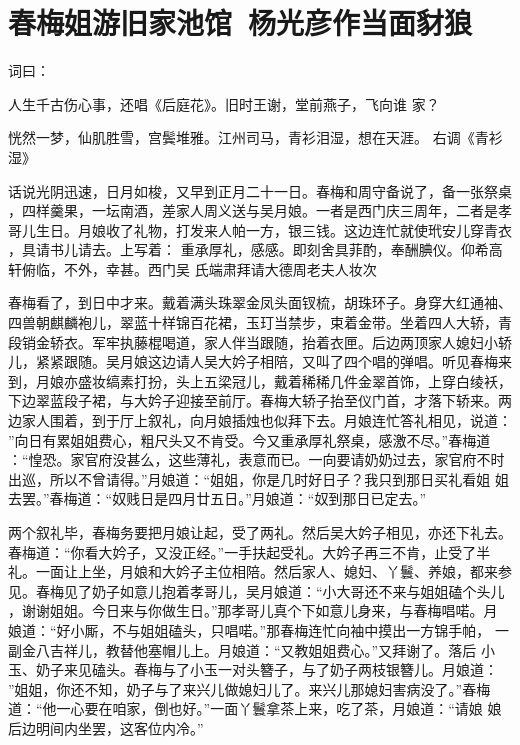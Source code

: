\chapter{春梅姐游旧家池馆~杨光彦作当面豺狼}

词曰：

人生千古伤心事，还唱《后庭花》。旧时王谢，堂前燕子，飞向谁
家？

恍然一梦，仙肌胜雪，宫鬓堆雅。江州司马，青衫泪湿，想在天涯。
右调《青衫湿》

话说光阴迅速，日月如梭，又早到正月二十一日。春梅和周守备说了，备一张祭桌
，四样羹果，一坛南酒，差家人周义送与吴月娘。一者是西门庆三周年，二者是孝
哥儿生日。月娘收了礼物，打发来人帕一方，银三钱。这边连忙就使玳安儿穿青衣
，具请书儿请去。上写着：
重承厚礼，感感。即刻舍具菲酌，奉酬腆仪。仰希高轩俯临，不外，幸甚。西门吴
氏端肃拜请大德周老夫人妆次

春梅看了，到日中才来。戴着满头珠翠金凤头面钗梳，胡珠环子。身穿大红通袖、
四兽朝麒麟袍儿，翠蓝十样锦百花裙，玉玎当禁步，束着金带。坐着四人大轿，青
段销金轿衣。军牢执藤棍喝道，家人伴当跟随，抬着衣匣。后边两顶家人媳妇小轿
儿，紧紧跟随。吴月娘这边请人吴大妗子相陪，又叫了四个唱的弹唱。听见春梅来
到，月娘亦盛妆缟素打扮，头上五梁冠儿，戴着稀稀几件金翠首饰，上穿白绫袄，
下边翠蓝段子裙，与大妗子迎接至前厅。春梅大轿子抬至仪门首，才落下轿来。两
边家人围着，到于厅上叙礼，向月娘插烛也似拜下去。月娘连忙答礼相见，说道：
”向日有累姐姐费心，粗尺头又不肯受。今又重承厚礼祭桌，感激不尽。”春梅道
：“惶恐。家官府没甚么，这些薄礼，表意而已。一向要请奶奶过去，家官府不时
出巡，所以不曾请得。”月娘道：“姐姐，你是几时好日子？我只到那日买礼看姐
姐去罢。”春梅道：“奴贱日是四月廿五日。”月娘道：“奴到那日已定去。”

两个叙礼毕，春梅务要把月娘让起，受了两礼。然后吴大妗子相见，亦还下礼去。
春梅道：“你看大妗子，又没正经。”一手扶起受礼。大妗子再三不肯，止受了半
礼。一面让上坐，月娘和大妗子主位相陪。然后家人、媳妇、丫鬟、养娘，都来参
见。春梅见了奶子如意儿抱着孝哥儿，吴月娘道：“小大哥还不来与姐姐磕个头儿
，谢谢姐姐。今日来与你做生日。”那孝哥儿真个下如意儿身来，与春梅唱喏。月
娘道：“好小厮，不与姐姐磕头，只唱喏。”那春梅连忙向袖中摸出一方锦手帕，
一副金八吉祥儿，教替他塞帽儿上。月娘道：“又教姐姐费心。”又拜谢了。落后
小玉、奶子来见磕头。春梅与了小玉一对头簪子，与了奶子两枝银簪儿。月娘道：
”姐姐，你还不知，奶子与了来兴儿做媳妇儿了。来兴儿那媳妇害病没了。”春梅
道：“他一心要在咱家，倒也好。”一面丫鬟拿茶上来，吃了茶，月娘道：“请娘
娘后边明间内坐罢，这客位内冷。”

